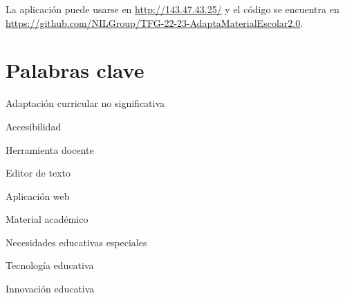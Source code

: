 La aplicación puede usarse en \url{http://143.47.43.25/} y el código se encuentra en \url{https://github.com/NILGroup/TFG-22-23-AdaptaMaterialEscolar2.0}.

\section*{Palabras clave}

Adaptación curricular no significativa

Accesibilidad

Herramienta docente

Editor de texto

Aplicación web

Material académico

Necesidades educativas especiales

Tecnología educativa

Innovación educativa



